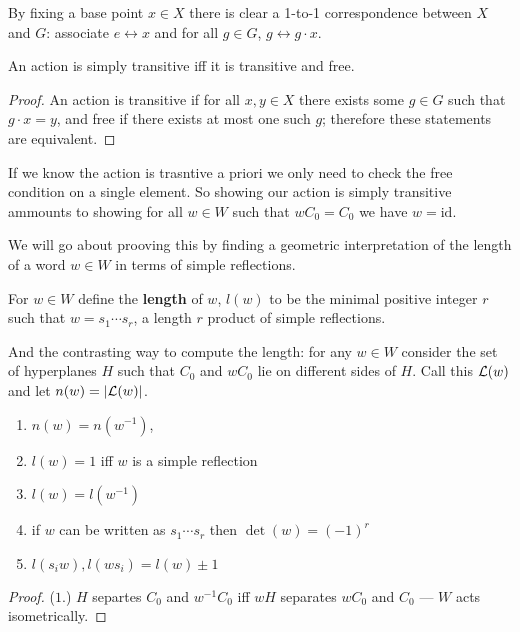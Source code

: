 \documentclass[../main.tex]{subfiles}
\begin{document}
By fixing a base point $x\in X$ there is clear a 1-to-1 correspondence between $X$ and $G$: associate $e\leftrightarrow x$ and for all $g\in G$, $g\leftrightarrow g\cdot x$.

\begin{proposition}
    An action is simply transitive iff it is transitive and free.
    \begin{proof}
        An action is transitive if for all $x,y\in X$ there exists some $g\in G$ such that $g\cdot x = y$, and free if there exists at most one such $g$; therefore these statements are equivalent.
    \end{proof}
\end{proposition}

If we know the action is trasntive a priori we only need to check the free condition on a single element. So showing our action is simply transitive ammounts to showing for all $w\in W$ such that $wC_0 = C_0$ we have $w=\text{id}$.

We will go about prooving this by finding a geometric interpretation of the length of a word $w\in W$ in terms of simple reflections.

\begin{definition}
    For $w\in W$ define the \textbf{length} of $w$, $l(w)$ to be the minimal positive integer $r$ such that $w=s_1\cdots s_r$, a length $r$ product of simple reflections.
\end{definition}

And the contrasting way to compute the length: for any $w\in W$ consider the set of hyperplanes $H$ such that $C_0$ and $wC_0$ lie on different sides of $H$. Call this $\mathcal{L}(w)$ and let $n(w) = |\mathcal{L}(w)|$.

\begin{lemma}
    \begin{enumerate}
        \item $n(w) = n(w^{-1})$,
        \item $l(w) = 1$ iff $w$ is a simple reflection
        \item $l(w) = l(w^{-1})$
        \item if $w$ can be written as $s_1\cdots s_r$ then $\det(w) = (-1)^r$
        \item $l(s_i w),l(w s_i) = l(w) \pm 1$
    \end{enumerate}
    \begin{proof}
        ($1.$) $H$ separtes $C_0$ and $w^{-1}C_0$ iff $wH$ separates $wC_0$ and $C_0$ --- $W$ acts isometrically.
    \end{proof}
\end{lemma}
\end{document}
